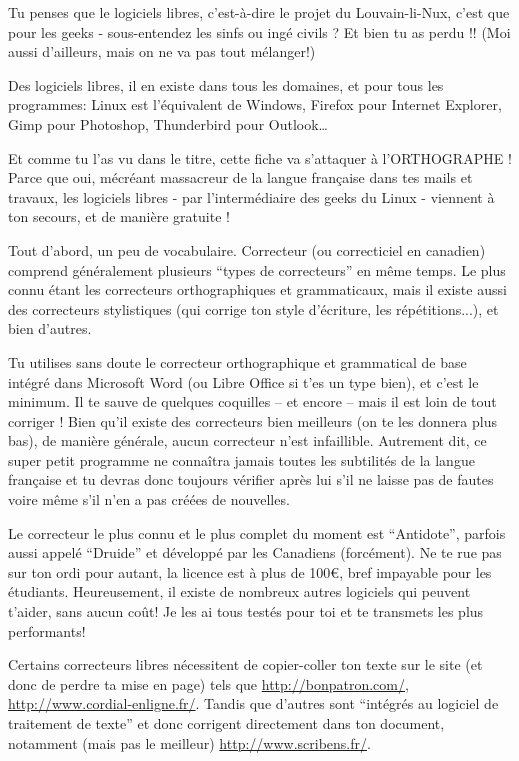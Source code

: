 \documentclass[12pt]{../fiche}
\begin{document}


Tu penses que le logiciels libres, c'est-à-dire le projet du Louvain-li-Nux, c'est que pour les geeks - sous-entendez les sinfs ou ingé civils ? Et bien tu as perdu !! (Moi aussi d'ailleurs, mais on ne va pas tout mélanger!)

Des logiciels libres, il en existe dans tous les domaines, et pour tous les programmes: Linux est l'équivalent de Windows, Firefox pour Internet Explorer, Gimp pour Photoshop, Thunderbird pour Outlook…

Et comme tu l'as vu dans le titre, cette fiche va s'attaquer à l'ORTHOGRAPHE ! Parce que oui, mécréant massacreur de la langue française dans tes mails et travaux, les logiciels libres - par l'intermédiaire des geeks du Linux - viennent à ton secours, et de manière gratuite !

Tout d'abord, un peu de vocabulaire. Correcteur (ou correcticiel en canadien) comprend généralement plusieurs ``types de correcteurs'' en même temps. Le plus connu étant les correcteurs orthographiques et grammaticaux, mais il existe aussi des correcteurs stylistiques (qui corrige ton style d'écriture, les répétitions...), et bien d'autres.

Tu utilises sans doute le correcteur orthographique et grammatical de base intégré dans Microsoft Word (ou Libre Office si t'es un type bien), et c'est le minimum. Il te sauve de quelques coquilles – et encore – mais il est loin de tout corriger ! Bien qu'il existe des correcteurs bien meilleurs (on te les donnera plus bas), de manière générale, aucun correcteur n'est infaillible. Autrement dit, ce super petit programme ne connaîtra jamais toutes les subtilités de la langue française et tu devras donc toujours vérifier après lui s'il ne laisse pas de fautes voire même s'il n'en a pas créées de nouvelles.

Le correcteur le plus connu et le plus complet du moment est ``Antidote'', parfois aussi appelé ``Druide'' et développé par les Canadiens (forcément). Ne te rue pas sur ton ordi pour autant, la licence est à plus de \si{100}{\euro}, bref impayable pour les étudiants. Heureusement, il existe de nombreux autres logiciels qui peuvent t'aider, sans aucun coût! Je les ai tous testés pour toi et te transmets les plus performants!

Certains correcteurs libres nécessitent de copier-coller ton texte sur le site (et donc de perdre ta mise en page) tels que \url{http://bonpatron.com/}, \url{http://www.cordial-enligne.fr/}.
Tandis que d'autres sont ``intégrés au logiciel de traitement de texte'' et donc corrigent directement dans ton document, notamment (mais pas le meilleur) \url{http://www.scribens.fr/}.
\end{document}
